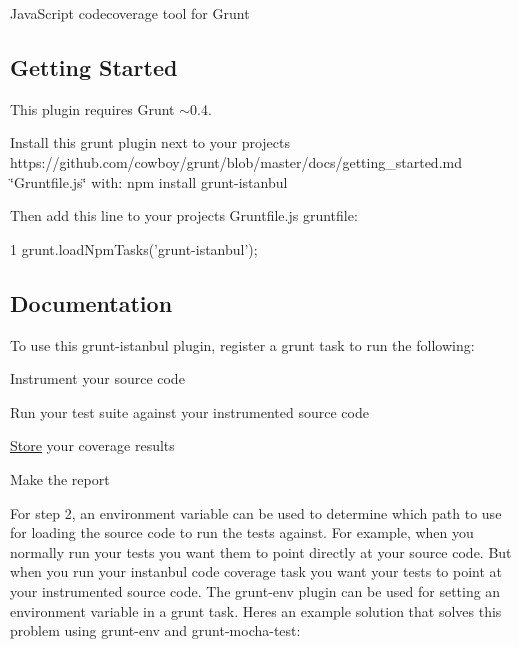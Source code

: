 Java\+Script codecoverage tool for Grunt

\subsection*{Getting Started}

This plugin requires Grunt $\sim$0.4.

Install this grunt plugin next to your project\textquotesingle{}s https\+://github.com/cowboy/grunt/blob/master/docs/getting\+\_\+started.\+md \char`\"{}\+Gruntfile.\+js\char`\"{} with\+: {\ttfamily npm install grunt-\/istanbul}

Then add this line to your project\textquotesingle{}s {\ttfamily Gruntfile.\+js} gruntfile\+:


\begin{DoxyCode}
1 grunt.loadNpmTasks('grunt-istanbul');
\end{DoxyCode}


\subsection*{Documentation}

To use this grunt-\/istanbul plugin, register a grunt task to run the following\+:


\begin{DoxyEnumerate}
\item Instrument your source code
\item Run your test suite against your instrumented source code
\item \hyperlink{class_store}{Store} your coverage results
\item Make the report
\end{DoxyEnumerate}

For step 2, an environment variable can be used to determine which path to use for loading the source code to run the tests against. For example, when you normally run your tests you want them to point directly at your source code. But when you run your instanbul code coverage task you want your tests to point at your instrumented source code. The {\ttfamily grunt-\/env} plugin can be used for setting an environment variable in a grunt task. Here\textquotesingle{}s an example solution that solves this problem using {\ttfamily grunt-\/env} and {\ttfamily grunt-\/mocha-\/test}\+:


